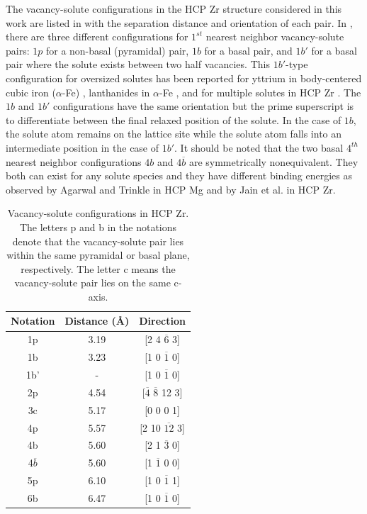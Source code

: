 \documentclass[preprint,12pt]{elsarticle}
\begin{document}
The vacancy-solute configurations in the HCP Zr structure considered in this work are listed in  with the separation distance and orientation of each pair. In , there are three different configurations for $1^{st}$ nearest neighbor vacancy-solute pairs: $1p$ for a non-basal (pyramidal) pair, $1b$ for a basal pair, and $1b'$ for a basal pair where the solute exists between two half vacancies. This $1b'$-type configuration for oversized solutes has been reported for yttrium in body-centered cubic iron ($\alpha$-Fe) \cite{bocquet_migration_2017}, lanthanides in $\alpha$-Fe \cite{yang_significant_2023}, and for multiple solutes in HCP Zr \cite{jain_first-principles_2019}. The $1b$ and $1b'$ configurations have the same orientation but the prime superscript is to differentiate between the final relaxed position of the solute. In the case of $1b$, the solute atom remains on the lattice site while the solute atom falls into an intermediate position in the case of $1b'$. It should be noted that the two basal $4^{th}$ nearest neighbor configurations $4b$ and $4\overline{b}$ are symmetrically nonequivalent. They both can exist for any solute species and they have different binding energies as observed by Agarwal and Trinkle \cite{agarwal_exact_2017} in HCP Mg and by Jain et al. \cite{jain_first-principles_2019} in HCP Zr.

\begin{table}[h!]
    \centering
    \caption{Vacancy-solute configurations in HCP Zr. The letters p and b in the notations denote that the vacancy-solute pair lies within the same pyramidal or basal plane, respectively. The letter c means the vacancy-solute pair lies on the same c-axis.}
    \label{tab:vac-solute_distance}
    \begin{tabular}{c|c|c}
        \toprule
         Notation& Distance ({\AA})& Direction  \\
         \hline
         1p&3.19 & [2 4 $\overline{6}$ 3] \\
         1b&3.23 &[1 0 $\overline{1}$ 0] \\
         1b'& - & [1 0 $\overline{1}$ 0] \\
         2p&4.54 &[$\overline{4}$ $\overline{8}$ 12  3] \\
         3c&5.17 &[0 0 0 1] \\
         4p &5.57 &[2 10 $\overline{12}$ 3] \\
         4b&5.60 &[2 1 $\overline{3}$ 0] \\
         4$\overline{b}$&5.60 &[1 $\overline{1}$ 0 0] \\
         5p &6.10 & [1 0 $\overline{1}$ 1]\\
         6b &6.47 &[1 0 $\overline{1}$ 0] \\
         \bottomrule
    \end{tabular}
\end{table}
\end{document}
